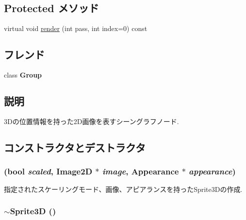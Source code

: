 \subsection*{Protected メソッド}
\begin{CompactItemize}
\item 
virtual void \hyperlink{classm3g_1_1Sprite3D_1efcb1973989d9963d5bd6d03065d389}{render} (int pass, int index=0) const 
\end{CompactItemize}
\subsection*{フレンド}
\begin{CompactItemize}
\item 
\hypertarget{classm3g_1_1Sprite3D_2697825715974a353728f0d4d5658112}{
class \textbf{Group}}
\label{classm3g_1_1Sprite3D_2697825715974a353728f0d4d5658112}

\end{CompactItemize}


\subsection{説明}
3Dの位置情報を持った2D画像を表すシーングラフノード. 

\subsection{コンストラクタとデストラクタ}
\hypertarget{classm3g_1_1Sprite3D_9cb33fd453d441ed8e99b95f5e29df0c}{
\subsubsection[{Sprite3D}]{ (bool {\em scaled}, \/  {\bf Image2D} $\ast$ {\em image}, \/  {\bf Appearance} $\ast$ {\em appearance})}}
\label{classm3g_1_1Sprite3D_9cb33fd453d441ed8e99b95f5e29df0c}


指定されたスケーリングモード、画像、アピアランスを持ったSprite3Dの作成. \hypertarget{classm3g_1_1Sprite3D_a57bd1e3141ba11c88ddec1e46c188d6}{
\subsubsection[{$\sim$Sprite3D}]{\setlength{\rightskip}{0pt plus 5cm}$\sim${\bf Sprite3D} ()}}
\label{classm3g_1_1Sprite3D_a57bd1e3141ba11c88ddec1e46c188d6}


